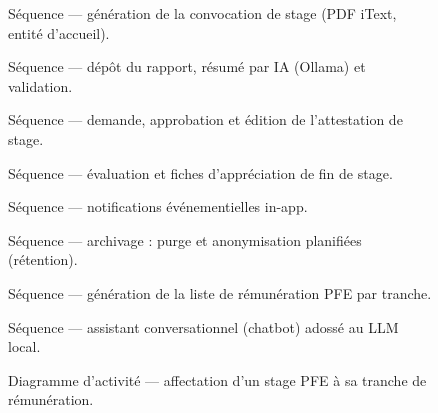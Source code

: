 \begin{figure}[H]
\centering
{}
\caption{Séquence — génération de la convocation de stage (PDF iText, entité d'accueil).}
\label{fig:seq-convocation}
\end{figure}

\begin{figure}[H]
\centering
{}
\caption{Séquence — dépôt du rapport, résumé par IA (Ollama) et validation.}
\label{fig:seq-rapport-ia}
\end{figure}

\begin{figure}[H]
\centering
{}
\caption{Séquence — demande, approbation et édition de l'attestation de stage.}
\label{fig:seq-attestation}
\end{figure}

\begin{figure}[H]
\centering
{}
\caption{Séquence — évaluation et fiches d'appréciation de fin de stage.}
\label{fig:seq-evaluation}
\end{figure}

\begin{figure}[H]
\centering
{}
\caption{Séquence — notifications événementielles in-app.}
\label{fig:seq-notification}
\end{figure}

\begin{figure}[H]
\centering
{}
\caption{Séquence — archivage : purge et anonymisation planifiées (rétention).}
\label{fig:seq-archivage}
\end{figure}

\begin{figure}[H]
\centering
{}
\caption{Séquence — génération de la liste de rémunération PFE par tranche.}
\label{fig:seq-remuneration}
\end{figure}

\begin{figure}[H]
\centering
{}
\caption{Séquence — assistant conversationnel (chatbot) adossé au LLM local.}
\label{fig:seq-chatbot}
\end{figure}


\begin{figure}[H]
\centering
{}
\caption{Diagramme d'activité — affectation d'un stage PFE à sa tranche de rémunération.}
\label{fig:act-remuneration}
\end{figure}
